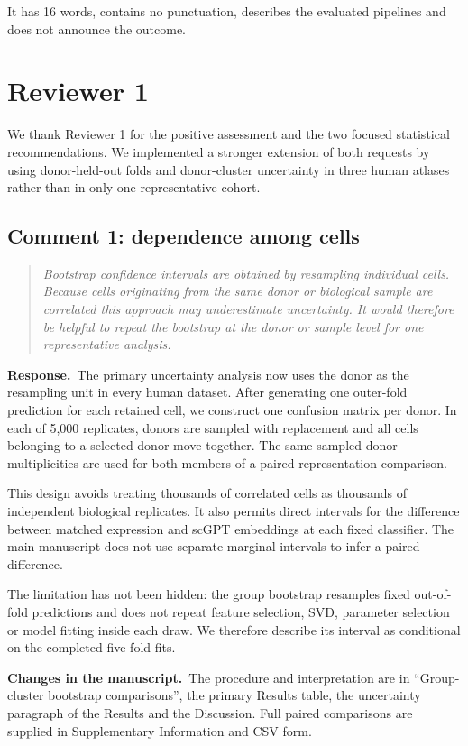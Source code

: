 \documentclass[11pt,a4paper]{article}
\newcommand{\commenttext}[1]{\begin{quote}\itshape #1\end{quote}}
\newcommand{\responsehead}{\par\noindent\textbf{Response.}\ }
\newcommand{\changehead}{\par\noindent\textbf{Changes in the manuscript.}\ }
\begin{document}
It has 16 words, contains no punctuation, describes the evaluated pipelines and does not announce the outcome.

\section*{Reviewer 1}

We thank Reviewer 1 for the positive assessment and the two focused statistical recommendations. We implemented a stronger extension of both requests by using donor-held-out folds and donor-cluster uncertainty in three human atlases rather than in only one representative cohort.

\subsection*{Comment 1: dependence among cells}

\commenttext{Bootstrap confidence intervals are obtained by resampling individual cells. Because cells originating from the same donor or biological sample are correlated this approach may underestimate uncertainty. It would therefore be helpful to repeat the bootstrap at the donor or sample level for one representative analysis.}

\responsehead The primary uncertainty analysis now uses the donor as the resampling unit in every human dataset. After generating one outer-fold prediction for each retained cell, we construct one confusion matrix per donor. In each of 5,000 replicates, donors are sampled with replacement and all cells belonging to a selected donor move together. The same sampled donor multiplicities are used for both members of a paired representation comparison.

This design avoids treating thousands of correlated cells as thousands of independent biological replicates. It also permits direct intervals for the difference between matched expression and scGPT embeddings at each fixed classifier. The main manuscript does not use separate marginal intervals to infer a paired difference.

The limitation has not been hidden: the group bootstrap resamples fixed out-of-fold predictions and does not repeat feature selection, SVD, parameter selection or model fitting inside each draw. We therefore describe its interval as conditional on the completed five-fold fits.

\changehead The procedure and interpretation are in ``Group-cluster bootstrap comparisons'', the primary Results table, the uncertainty paragraph of the Results and the Discussion. Full paired comparisons are supplied in Supplementary Information and CSV form.
\end{document}
